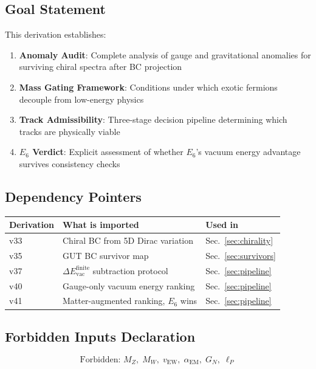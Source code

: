 \documentclass[11pt,a4paper]{article}
\begin{document}
\subsection{Goal Statement}

This derivation establishes:
\begin{enumerate}
    \item \textbf{Anomaly Audit}: Complete analysis of gauge and gravitational anomalies for surviving chiral spectra after BC projection
    \item \textbf{Mass Gating Framework}: Conditions under which exotic fermions decouple from low-energy physics
    \item \textbf{Track Admissibility}: Three-stage decision pipeline determining which tracks are physically viable
    \item \textbf{$E_6$ Verdict}: Explicit assessment of whether $E_6$'s vacuum energy advantage survives consistency checks
\end{enumerate}

\subsection{Dependency Pointers}

\begin{center}
\begin{tabular}{lll}
\toprule
Derivation & What is imported & Used in \\
\midrule
v33 & Chiral BC from 5D Dirac variation & Sec.~\ref{sec:chirality} \\
v35 & GUT BC survivor map & Sec.~\ref{sec:survivors} \\
v37 & $\Delta E_{\text{vac}}^{\text{finite}}$ subtraction protocol & Sec.~\ref{sec:pipeline} \\
v40 & Gauge-only vacuum energy ranking & Sec.~\ref{sec:pipeline} \\
v41 & Matter-augmented ranking, $E_6$ wins & Sec.~\ref{sec:pipeline} \\
\bottomrule
\end{tabular}
\end{center}

\subsection{Forbidden Inputs Declaration}

\begin{equation}
\label{eq:forbidden}
\boxed{\text{Forbidden: } M_Z,\; M_W,\; v_{\text{EW}},\; \alpha_{\text{EM}},\; G_N,\; \ell_P}
\end{equation}
\end{document}
